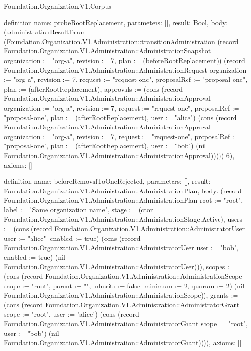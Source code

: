 \begin{lexlean}{Foundation.Organization.V1.Corpus}
\begin{semanticmodule}
definition{
  name: probeRootReplacement,
  parameters: [],
  result: Bool,
  body: (administrationResultError (Foundation.Organization.V1.Administration::transitionAdministration (record Foundation.Organization.V1.Administration::AdministrationSnapshot {organization := "org-a", revision := 7, plan := (beforeRootReplacement)}) (record Foundation.Organization.V1.Administration::AdministrationRequest {organization := "org-a", revision := 7, request := "request-one", proposalRef := "proposal-one", plan := (afterRootReplacement), approvals := (cons (record Foundation.Organization.V1.Administration::AdministrationApproval {organization := "org-a", revision := 7, request := "request-one", proposalRef := "proposal-one", plan := (afterRootReplacement), user := "alice"}) (cons (record Foundation.Organization.V1.Administration::AdministrationApproval {organization := "org-a", revision := 7, request := "request-one", proposalRef := "proposal-one", plan := (afterRootReplacement), user := "bob"}) (nil Foundation.Organization.V1.Administration::AdministrationApproval)))})) 6),
  axioms: []
}

definition{
  name: beforeRemovalToOneRejected,
  parameters: [],
  result: Foundation.Organization.V1.Administration::AdministrationPlan,
  body: (record Foundation.Organization.V1.Administration::AdministrationPlan {root := "root", label := "Same organization name", stage := (ctor Foundation.Organization.V1.Administration::AdministrationStage.Active), users := (cons (record Foundation.Organization.V1.Administration::AdministratorUser {user := "alice", enabled := true}) (cons (record Foundation.Organization.V1.Administration::AdministratorUser {user := "bob", enabled := true}) (nil Foundation.Organization.V1.Administration::AdministratorUser))), scopes := (cons (record Foundation.Organization.V1.Administration::AdministrationScope {scope := "root", parent := "", inherits := false, minimum := 2, quorum := 2}) (nil Foundation.Organization.V1.Administration::AdministrationScope)), grants := (cons (record Foundation.Organization.V1.Administration::AdministratorGrant {scope := "root", user := "alice"}) (cons (record Foundation.Organization.V1.Administration::AdministratorGrant {scope := "root", user := "bob"}) (nil Foundation.Organization.V1.Administration::AdministratorGrant)))}),
  axioms: []
}


\end{semanticmodule}
\end{lexlean}
